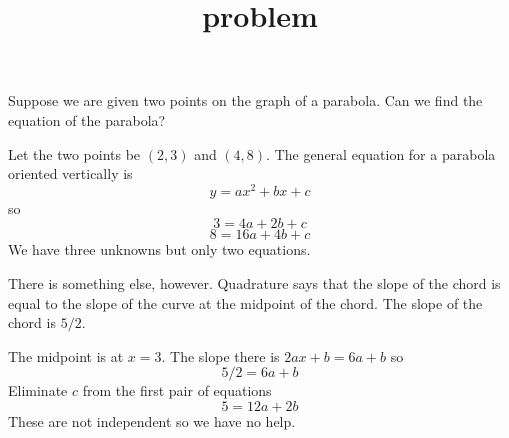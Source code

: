 \documentclass[11pt, oneside]{article}
\title{problem}
\date{}
\begin{document}
\maketitle
\Large

Suppose we are given two points on the graph of a parabola.  Can we find the equation of the parabola?

Let the two points be $(2,3)$ and $(4,8)$.  The general equation for a parabola oriented vertically is
\[ y = ax^2 + bx + c \]
so
\[ 3 = 4a + 2b + c \]
\[ 8 = 16a + 4b + c \]
We have three unknowns but only two equations.

There is something else, however.  Quadrature says that the slope of the chord is equal to the slope of the curve at the midpoint of the chord.  The slope of the chord is $5/2$.

The midpoint is at $x=3$.  The slope there is $2ax + b = 6a + b$ so
\[ 5/2 = 6a + b \]
Eliminate $c$ from the first pair of equations
\[ 5 = 12a + 2b \]
These are not independent so we have no help.
\end{document}
